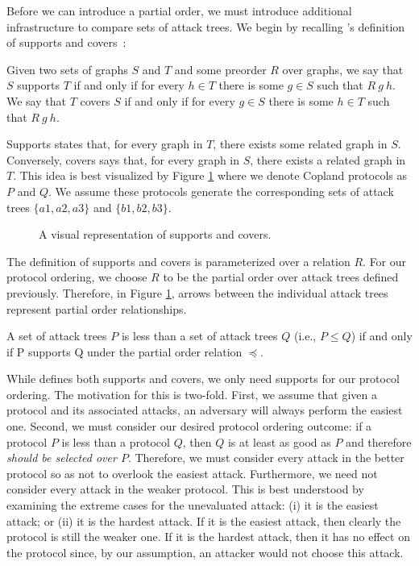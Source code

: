\documentclass[runningheads]{llncs}
\theoremstyle{definition}
\begin{document}
Before we can introduce a partial order, we must introduce additional
infrastructure to compare sets of attack trees. We begin by recalling
\citeauthor{Rowe:2021:OnOrdering}'s definition of supports and
covers~\citep{Rowe:2021:OnOrdering}: 

\begin{definition}
    Given two sets of graphs $S$ and $T$ and some preorder $R$ over
    graphs, we say that $S$ supports $T$ if and only if for every $h
    \in T$ there is some $g \in S$ such that $R\: g\: h$. We  say
    that $T$ covers $S$ if and only if for every $g \in S$ there is
    some $h \in T$ such that $R\: g\: h$. 
\end{definition}

\noindent Supports states that, for every graph in $T$, there exists some
related graph in $S$. Conversely, covers says that, for every graph in
$S$, there exists a related graph in $T$.  This idea is best
visualized by Figure \ref{fig:sup-cov} where we denote Copland
protocols as $P$ and $Q$. We assume these protocols generate the
corresponding sets of attack trees $\{a1, a2, a3 \}$ and
$ \{b1, b2 ,b3\}$.

\begin{figure}[htbp]
    \centering
    
    \captionsetup{justification=centering,margin=1cm}
    \caption[Supports and covers]{A visual representation of supports and covers.}
    \label{fig:sup-cov}
\end{figure}

The definition of supports and covers is parameterized over a relation
$R$. For our protocol ordering, we choose $R$ to be the partial order
over attack trees defined previously. Therefore, in Figure
\ref{fig:sup-cov}, arrows between the individual attack trees
represent partial order relationships. 

\begin{definition}
  A set of attack trees $P$ is less than a set of attack trees $Q$
  (i.e., $P \leq Q$) if and only if P supports Q under the partial
  order relation $\preceq$. 
\end{definition} 

While \citeauthor{Rowe:2021:OnOrdering} defines both supports and
covers, we only need supports for our protocol ordering. The
motivation for this is two-fold. First, we assume that given a protocol
and its associated attacks, an adversary will always perform the
easiest one.  Second, we must consider our desired protocol ordering
outcome: if a protocol $P$ is less than a protocol $Q$, then $Q$ is at
least as good as $P$ and therefore \emph{should be selected over
  $P$}. Therefore, we must consider every attack in the better
protocol so as not to overlook the easiest attack. Furthermore, we
need not consider every attack in the weaker protocol. This is best
understood by examining the extreme cases for the unevaluated attack:
(i) it is the easiest attack; or (ii) it is the hardest attack. If it
is the easiest attack, then clearly the protocol is still the weaker
one. If it is the hardest attack, then it has no effect on the
protocol since, by our assumption, an attacker would not choose this
attack.
\end{document}
